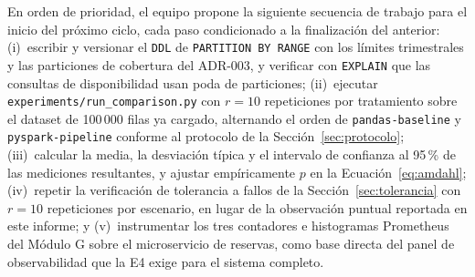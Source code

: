 \documentclass[10pt,twocolumn]{article}
\begin{document}
En orden de prioridad, el equipo propone la siguiente secuencia de trabajo
para el inicio del próximo ciclo, cada paso condicionado a la finalización
del anterior: (i)~escribir y versionar el \texttt{DDL} de
\texttt{PARTITION BY RANGE} con los límites trimestrales y las particiones
de cobertura del ADR-003, y verificar con \texttt{EXPLAIN} que las
consultas de disponibilidad usan poda de particiones; (ii)~ejecutar
\texttt{experiments/run\_comparison.py} con $r=10$ repeticiones por
tratamiento sobre el dataset de 100\,000 filas ya cargado, alternando el
orden de \texttt{pandas-baseline} y \texttt{pyspark-pipeline} conforme al
protocolo de la Sección~\ref{sec:protocolo}; (iii)~calcular la media, la
desviación típica y el intervalo de confianza al 95\,\% de las mediciones
resultantes, y ajustar empíricamente $p$ en la Ecuación~\eqref{eq:amdahl};
(iv)~repetir la verificación de tolerancia a fallos de la
Sección~\ref{sec:tolerancia} con $r=10$ repeticiones por escenario, en
lugar de la observación puntual reportada en este informe; y
(v)~instrumentar los tres contadores e histogramas Prometheus del Módulo G
sobre el microservicio de reservas, como base directa del panel de
observabilidad que la E4 exige para el sistema completo.



\end{document}
